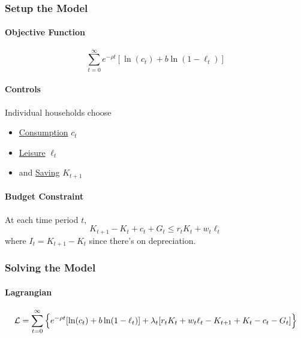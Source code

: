 \documentclass[11pt]{article}
\begin{document}
			\subsubsection{Setup the Model}
			\paragraph{Objective Function}
				\begin{equation}
					\sum_{t=0}^\infty e^{-\rho t} [\ln(c_t) + b\ln(1-\ell_t)]
				\end{equation}
			
			\paragraph{Controls} Individual households choose 
				\begin{itemize}
					\item \ul{Consumption} $c_t$
					\item \ul{Leisure} $\ell_t$
					\item and \ul{Saving} $K_{t+1}$
				\end{itemize}
			\paragraph{Budget Constraint} At each time period $t$,
			\begin{equation}
				K_{t+1} - K_t + c_t + G_t \leq r_t K_t + w_t \ell_t
			\end{equation}
			where $I_{t} = K_{t+1} - K_t$ since there's on depreciation.
			
			\subsubsection{Solving the Model}
			\paragraph{Lagrangian}
			\begin{gather}
				\mathcal{{L}} = \sum_{t=0}^\infty \Big\{e^{-\rho t} [\ln(c_t) + b\ln(1-\ell_t)]
				+ \lambda_t [r_t K_t + w_t \ell_t - K_{t+1} + K_t - c_t - G_t] \Big\}
			\end{gather}
\end{document}
